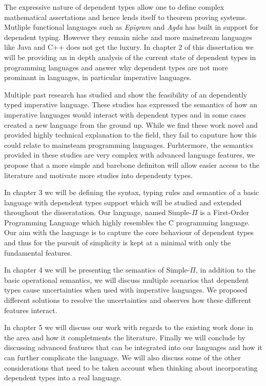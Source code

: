 \documentclass[a4paper,12pt]{report}
\begin{document}
\par
The expressive nature of dependent types allow one to define complex 
mathematical assertations and hence lends itself to theorem proving systems. 
Mutliple functional languages such as \textit{Epigram} 
\cite{epigram} and \textit{Agda} \cite{agda} has 
built in support for dependent typing. However they remain niche and more 
mainstream languages like Java and C++ does not get the luxury. In chapter 2 of 
this dissertation we will be providing an in depth analysis of the current state 
of dependent types in programming languages and answer why dependent types are 
not more prominant in languages, in particular imperative languages.

\par
Multiple past research has studied and show the feasibility of an dependently typed 
imperative language. These studies has expressed the semantics of 
how an imperative languages would interact with dependent types and in some 
cases created a new language from the ground up. While we find these work novel 
and provided highly technical explanation to the field, they fail to caputure 
how this could relate to mainsteam programming languages. Furhtermore, the 
semantics provided in these studies are very complex with advanced language 
features, we propose that a more simple and barebone definiton will allow easier 
access to the literature and motivate more studies into dependenty types. 

\par
In chapter 3 we will be defining the syntax, typing rules and semantics 
of a basic language with dependent types support which will be studied 
and extended throughout the disseratation. Our language, named Simple-$\Pi$ is a 
First-Order Programming Language which highly resembles the C programming 
language. Our aim with the language is to capture the core behaviour of 
dependent types and thus for the pursuit of simplicity is kept at a minimal with 
only the fundamental features. 

\par
In chapter 4 we will be presenting the semantics of Simple-$\Pi$, in addition 
to the basic operational semantics, we will discuss
multiple scenarios that dependent types cause uncertainties when used with 
imperative languages. We proposed different solutions to resolve the 
uncertainties and observes how these different features interact. 

\par
In chapter 5 we will discuss our work with regards to the 
existing work done in the area and how it completments the literature. 
Finally we will conclude by discussing advanced features that can be integrated 
into our languages and how it can further complicate the language. We will also 
discuss some of the other considerations that need to be taken account when 
thinking about incorporating dependent types into a real language. 
\end{document}
